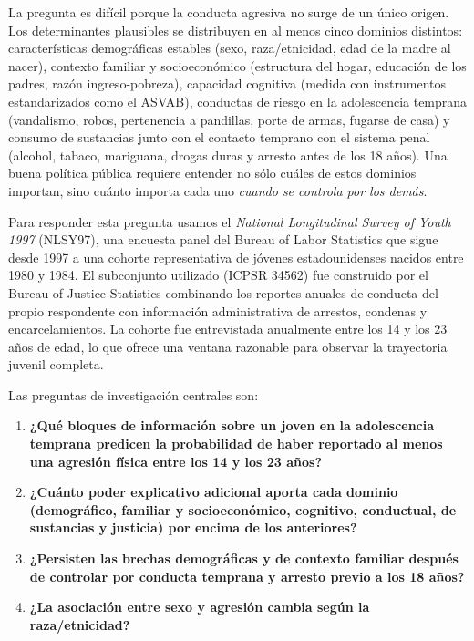 \documentclass[11pt]{article}
\begin{document}
La pregunta es difícil porque la conducta agresiva no surge de un único origen. Los determinantes plausibles se distribuyen en al menos cinco dominios distintos: características demográficas estables (sexo, raza/etnicidad, edad de la madre al nacer), contexto familiar y socioeconómico (estructura del hogar, educación de los padres, razón ingreso-pobreza), capacidad cognitiva (medida con instrumentos estandarizados como el ASVAB), conductas de riesgo en la adolescencia temprana (vandalismo, robos, pertenencia a pandillas, porte de armas, fugarse de casa) y consumo de sustancias junto con el contacto temprano con el sistema penal (alcohol, tabaco, mariguana, drogas duras y arresto antes de los 18 años). Una buena política pública requiere entender no sólo cuáles de estos dominios importan, sino cuánto importa cada uno \textit{cuando se controla por los demás}.

Para responder esta pregunta usamos el \textit{National Longitudinal Survey of Youth 1997} (NLSY97), una encuesta panel del Bureau of Labor Statistics que sigue desde 1997 a una cohorte representativa de jóvenes estadounidenses nacidos entre 1980 y 1984. El subconjunto utilizado (ICPSR 34562) fue construido por el Bureau of Justice Statistics combinando los reportes anuales de conducta del propio respondente con información administrativa de arrestos, condenas y encarcelamientos. La cohorte fue entrevistada anualmente entre los 14 y los 23 años de edad, lo que ofrece una ventana razonable para observar la trayectoria juvenil completa.

Las preguntas de investigación centrales son:
\begin{enumerate}
\item \textbf{¿Qué bloques de información sobre un joven en la adolescencia temprana predicen la probabilidad de haber reportado al menos una agresión física entre los 14 y los 23 años?}
\item \textbf{¿Cuánto poder explicativo adicional aporta cada dominio (demográfico, familiar y socioeconómico, cognitivo, conductual, de sustancias y justicia) por encima de los anteriores?}
\item \textbf{¿Persisten las brechas demográficas y de contexto familiar después de controlar por conducta temprana y arresto previo a los 18 años?}
\item \textbf{¿La asociación entre sexo y agresión cambia según la raza/etnicidad?}
\end{enumerate}

\end{document}
